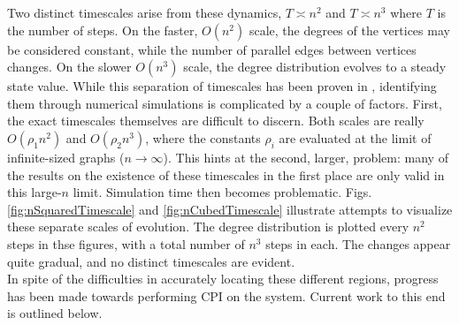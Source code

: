 \documentclass[11pt]{article}
\begin{document}
Two distinct timescales arise from these dynamics, $T\asymp n^{2}$ and $T\asymp n^{3}$ where $T$ is the number of steps. On the faster, $O(n^{2})$ scale, the degrees of the vertices may be considered constant, while the number of parallel edges between vertices changes. On the slower $O(n^{3})$ scale, the degree distribution evolves to a steady state value. While this separation of timescales has been proven in \cite{balazs:rsa12}, identifying them through numerical simulations is complicated by a couple of factors. First, the exact timescales themselves are difficult to discern. Both scales are really $O(\rho_{1} n^{2})$ and $O(\rho_{2} n^{3})$, where the constants $\rho_{i}$ are evaluated at the limit of infinite-sized graphs ($n\rightarrow \infty$). This hints at the second, larger, problem: many of the results on the existence of these timescales in the first place are only valid in this large-$n$ limit. Simulation time then becomes problematic. Figs. \ref{fig:nSquaredTimescale} and \ref{fig:nCubedTimescale} illustrate attempts to visualize these separate scales of evolution. The degree distribution is plotted every $n^{2}$ steps in thse figures, with a total number of $n^{3}$ steps in each. The changes appear quite gradual, and no distinct timescales are evident.\\
\indent In spite of the difficulties in accurately locating these different regions, progress has been made towards performing CPI on the system. Current work to this end is outlined below.
\clearpage
\end{document}
